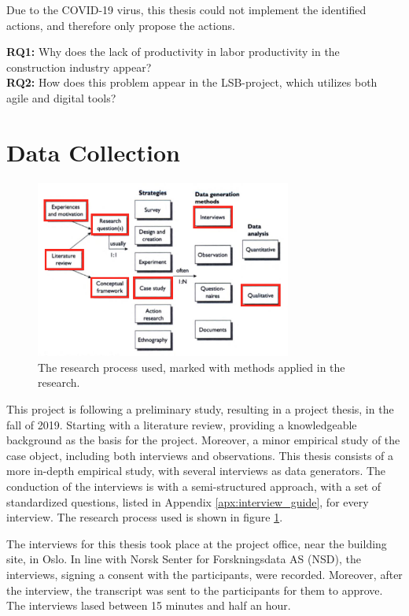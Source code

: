 Due to the COVID-19 virus, this thesis could not implement the identified actions, and therefore only propose the actions.

{\noindent \bf RQ1:} Why does the lack of productivity in labor productivity in the construction industry appear? \\
{\bf RQ2:} How does this problem appear in the LSB-project, which utilizes both agile and digital tools?

\section{Data Collection}
\begin{figure}
    \begin{center}
        \includegraphics[width=0.75\textwidth]{fig/research_process_master.png}
        \caption{The research process used, marked with methods applied in the research.}
        \label{fig:research_process_master}
    \end{center}
\end{figure}

This project is following a preliminary study, resulting in a project thesis, in the fall of 2019. Starting with a literature review, providing a knowledgeable background as the basis for the project. Moreover, a minor empirical study of the case object, including both interviews and observations. This thesis consists of a more in-depth empirical study, with several interviews as data generators. The conduction of the interviews is with a semi-structured approach, with a set of standardized questions, listed in Appendix \ref{apx:interview_guide}, for every interview. The research process used is shown in figure \ref{fig:research_process_master}.

The interviews for this thesis took place at the project office, near the building site, in Oslo. In line with Norsk Senter for Forskningsdata AS (NSD), the interviews, signing a consent with the participants, were recorded. Moreover, after the interview, the transcript was sent to the participants for them to approve. The interviews lased between 15 minutes and half an hour.

